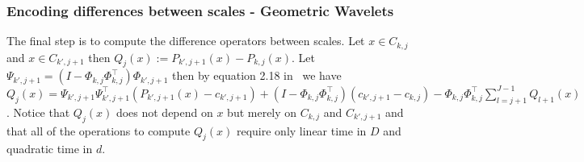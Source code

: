 \documentclass{article}
\begin{document}
	\subsubsection{Encoding differences between scales - Geometric Wavelets}
	The final step is to compute the difference operators between scales. Let $x \in C_{k,j}$ and $x \in C_{k',j+1}$ then $Q_j(x) := P_{k',j+1}(x) - P_{k,j}(x)$. Let $\Psi_{k',j+1} = \left(I - \Phi_{k,j}\Phi_{k,j}^{\top}\right)\Phi_{k',j+1}$ then by equation 2.18 in~\cite{allard2012multi} we have $Q_j(x) = \Psi_{k',j+1}\Psi_{k',j+1}^{\top}\left(P_{k',j+1}(x) - c_{k',j+1}\right) + \left(I - \Phi_{k,j}\Phi_{k,j}^{\top}\right)(c_{k',j+1} - c_{k,j}) - \Phi_{k,j}\Phi_{k,j}^{\top}\sum_{l=j+1}^{J-1}Q_{l+1}(x)$. Notice that $Q_j(x)$ does not depend on $x$ but merely on $C_{k,j}$ and $C_{k',j+1}$ and that all of the operations to compute $Q_j(x)$ require only linear time in $D$ and quadratic time in $d$.
\end{document}
